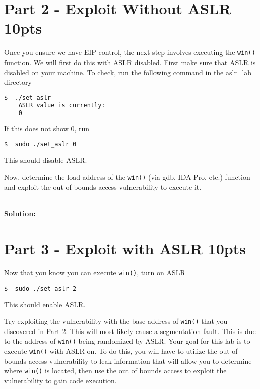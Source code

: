 \documentclass[10.9pt]{article}
\newcommand\tab[1][0.5cm]{\hspace*{#1}}
\begin{document}
\section{Part 2 - Exploit Without ASLR 10pts}
\tab Once you ensure we have EIP control, the next step involves executing the \texttt{win()} function. We will first do this with ASLR disabled. First make sure that ASLR is disabled on your machine. To check, run the following command in the aslr\_lab directory
\begin{lstlisting}[language=bash]
	$  ./set_aslr
	ASLR value is currently:
	0
\end{lstlisting}
\tab If this does not show 0, run
\begin{lstlisting}[language=bash]
	$  sudo ./set_aslr 0
\end{lstlisting}
\tab This should disable ASLR.

\tab Now, determine the load address of the \texttt{win()} (via gdb, IDA Pro, etc.) function and exploit the out of bounds access vulnerability to execute it.

\textbf{\\Solution:\\}


\section{Part 3 - Exploit with ASLR 10pts }
\tab Now that you know you can execute \texttt{win()}, turn on ASLR
\begin{lstlisting}[language=bash]
	$  sudo ./set_aslr 2
\end{lstlisting}
\tab This should enable ASLR.

\tab Try exploiting the vulnerability with the base address of \texttt{win()} that you discovered in Part 2. This will most likely cause a segmentation fault. This is due to the address of \texttt{win()} being randomized by ASLR. Your goal for this lab is to execute \texttt{win()} with ASLR on. To do this, you will have to utilize the out of bounds access vulnerability to leak information that will allow you to determine where \texttt{win()} is located, then use the out of bounds access to exploit the vulnerability to gain code execution.
\end{document}
